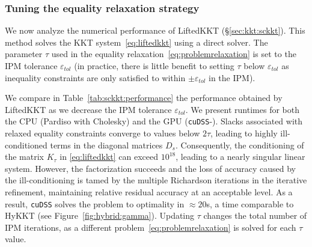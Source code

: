 \subsubsection{Tuning the equality relaxation strategy}
We now analyze the numerical performance of LiftedKKT (\S\ref{sec:kkt:sckkt}).
This method solves the KKT system~\eqref{eq:liftedkkt} using a direct solver.
The parameter $\tau$ used in the equality relaxation~\eqref{eq:problemrelaxation}
is set to the IPM tolerance $\varepsilon_{tol}$ (in practice, there is little benefit
to setting $\tau$ below $\varepsilon_{tol}$ as
inequality constraints are only satisfied to within $\pm \varepsilon_{tol}$ in the IPM).

We compare in Table~\ref{tab:sckkt:performance} the performance obtained by LiftedKKT
as we decrease the IPM tolerance $\varepsilon_{tol}$.
We present runtimes for both the CPU (Pardiso with Cholesky) and the GPU ({\tt cuDSS}-\ldlt).
Slacks associated with relaxed equality constraints converge to values below $2 \tau$,
leading to highly ill-conditioned terms in the diagonal matrices $D_s$.
Consequently, the conditioning of the matrix $K_\tau$ in \eqref{eq:liftedkkt} can exceed
$10^{18}$, leading to a nearly singular linear system.
However, the factorization succeeds and the loss of accuracy caused by the ill-conditioning is tamed by the multiple
Richardson iterations in the iterative refinement, maintaining relative
residual accuracy at an acceptable level.
As a result, {\tt cuDSS} solves
the problem to optimality in $\approx 20$s, a time comparable to HyKKT (see Figure~\ref{fig:hybrid:gamma}).
Updating $\tau$ changes the total number of IPM iterations,
as a different problem~\eqref{eq:problemrelaxation} is solved for each $\tau$ value.

\begin{table}[!ht]
  \centering
  \caption{Performance of the equality-relaxation
    strategy as the IPM tolerance $\varepsilon_{tol}$ decreases.
    Runtimes are shown for CPU (using Pardiso-\ldlt)
    and GPU ({\tt cuDSS}-\ldlt). 
  \label{tab:sckkt:performance}
  }
\end{table}


